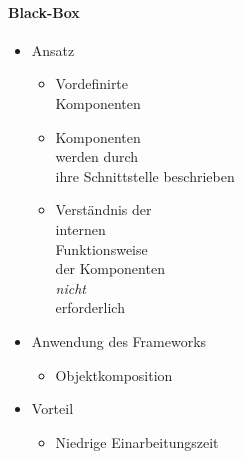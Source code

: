 \documentclass
[
	8pt,		%
	ngerman,	%
	a4paper,	%
	landscape,	%
	final		%
]{extarticle}
\begin{document}
\begin{multicols*}{4}
{\begin{multicols*}{2}
			\paragraph{Black-Box}
			\begin{itemize}
				\item Ansatz
				      \begin{itemize}[leftmargin=4pt,nolistsep]
					      \item Vordefinirte\\Komponenten
					      \item Komponenten\\werden durch\\ihre Schnittstelle
					            beschrieben
					      \item Verständnis der\\internen\\Funktionsweise\\der
					            Komponenten\\\emph{nicht}\\erforderlich
				      \end{itemize}
				\item Anwendung des Frameworks
				      \begin{itemize}[leftmargin=4pt,nolistsep]
					      \item Objektkomposition
				      \end{itemize}
				\item Vorteil
				      \begin{itemize}[leftmargin=4pt,nolistsep]
					      \item Niedrige Einarbeitungszeit
				      \end{itemize}
			\end{itemize}
			\columnbreak

\end{multicols*}}
\end{multicols*}
\end{document}
